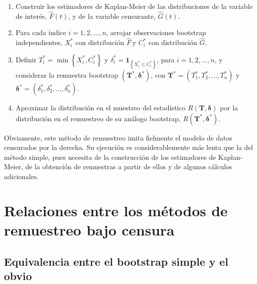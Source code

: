 \documentclass[
]{book}
\theoremstyle{definition}
\theoremstyle{definition}
\theoremstyle{definition}
\theoremstyle{remark}
\begin{document}
\begin{enumerate}
\def\labelenumi{\arabic{enumi}.}
\item
  Construir los estimadores de Kaplan-Meier de las distribuciones de
  la variable de interés, \(\hat{F}\left( t \right)\), y de la variable
  censurante, \(\hat{G}\left( t \right)\).
\item
  Para cada índice \(i=1,2,\ldots ,n\), arrojar observaciones bootstrap
  independientes, \(X_i^{\ast}\) con distribución \(\hat{F}\ \)y
  \(C_i^{\ast}\) con distribución \(\hat{G}\).
\item
  Definir \(T_i^{\ast}=\min \left\{ X_i^{\ast},C_i^{\ast}\right\}\) y
  \(\delta_i^{\ast}=\mathbf{1}_{\left\{ X_i^{\ast}\leq C_i^{\ast}\right\}}\), para \(i = 1, 2, \ldots, n\),
  y considerar la remuestra bootstrap
  \(\left( \mathbf{T}^{\ast},\boldsymbol{\delta}^{\ast}\right)\), con
  \(\mathbf{T}^{\ast}=\left( T_1^{\ast},T_2^{\ast}, \ldots, T_n^{\ast} \right)\) y \(\boldsymbol{\delta}^{\ast} = \left( \delta_1^{\ast}, \delta_2^{\ast},\ldots ,\delta_n^{\ast} \right)\).
\item
  Aproximar la distribución en el muestreo del estadístico
  \(R\left( \mathbf{T},\boldsymbol{\delta} \right)\) por la
  distribución en el remuestreo de su análogo bootstrap, \(R\left( \mathbf{T}^{\ast},\boldsymbol{\delta}^{\ast} \right)\).
\end{enumerate}

Obviamente, este método de remuestreo imita fielmente el modelo de datos
censurados por la derecha. Su ejecución es considerablemente más lenta
que la del método simple, pues necesita de la construcción de los
estimadores de Kaplan-Meier, de la obtención de remuestras a partir de
ellos y de algunos cálculos adicionales.

\hypertarget{relaciones-entre-los-muxe9todos-de-remuestreo-bajo-censura}{%
\section{Relaciones entre los métodos de remuestreo bajo censura}\label{relaciones-entre-los-muxe9todos-de-remuestreo-bajo-censura}}

\hypertarget{equivalencia-entre-el-bootstrap-simple-y-el-obvio}{%
\subsection{Equivalencia entre el bootstrap simple y el obvio}\label{equivalencia-entre-el-bootstrap-simple-y-el-obvio}}
\end{document}
